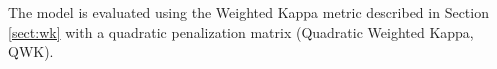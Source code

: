 \documentclass[journal]{IEEEtran}
\begin{document}
	The model is evaluated using the Weighted Kappa metric described in Section \ref{sect:wk} with a quadratic penalization matrix (Quadratic Weighted Kappa, QWK).
	
\end{document}
